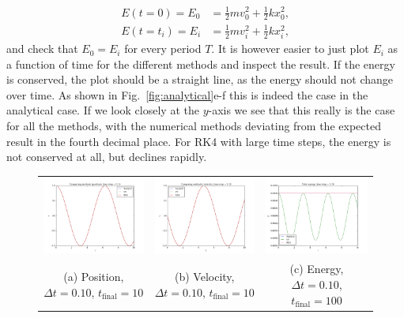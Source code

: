 \documentclass{article}
\begin{document}
\begin{multicols}{2}
\begin{equation}
	\begin{aligned}
		E(t = 0) = E_0 &= \frac{1}{2}mv_0^2 + \frac{1}{2}kx_0^2, \\
		E(t = t_i) = E_i &= \frac{1}{2}mv_i^2 + \frac{1}{2}kx_i^2,
	\end{aligned}
\end{equation}
and check that $E_0 = E_i$ for every period $T$. It is however easier to just plot $E_i$ as a function of time for the different methods and inspect the result. If the energy is conserved, the plot should be a straight line, as the energy should not change over time. As shown in Fig.~\ref{fig:analytical}e-f this is indeed the case in the analytical case. If we look closely at the $y$-axis we see that this really is the case for all the methods, with the numerical methods deviating from the expected result in the fourth decimal place. For RK4 with large time steps, the energy is not conserved at all, but declines rapidly.\\


\begin{figure}
\begin{center}
\begin{tabular}{ccc}
  	\includegraphics[width=60mm]{Images/comparison_x_01.png}
	& \includegraphics[width=60mm]{Images/comparison_v_01.png}
	& \includegraphics[width=60mm]{Images/comparison_E_01.png} \\
	(a) Position, $\Delta t = 0.10$, $t_{\mathrm{final}} = 10$		& (b) Velocity, $\Delta t = 0.10$, $t_{\mathrm{final}} = 10$  	& (c) Energy, $\Delta t = 0.10$, $t_{\mathrm{final}} = 100$ \\[6pt]
	

\end{tabular}
\end{center}
\end{figure}
\end{multicols}
\end{document}
